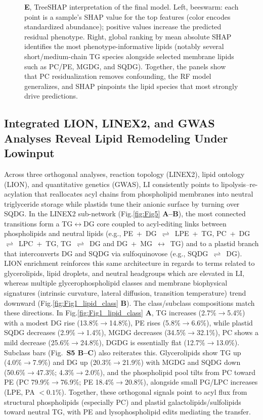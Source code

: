 \documentclass[10pt,letterpaper]{article}
\begin{document}
\begin{figure}[!ht]
{  \textbf{E}, TreeSHAP interpretation of the final model. Left, beeswarm: each point is a sample’s SHAP value for the top features (color encodes standardized abundance); positive values increase the predicted residual phenotype. Right, global ranking by mean absolute SHAP identifies the most phenotype-informative lipids (notably several short/medium-chain TG species alongside selected membrane lipids such as PC/PE, MGDG, and SQDG). 
  Together, the panels show that PC residualization removes confounding, the RF model generalizes, and SHAP pinpoints the lipid species that most strongly drive predictions.}
  \label{fig:fig4_rf_shap}
\end{figure}





\subsection*{Integrated LION, LINEX2, and GWAS Analyses Reveal Lipid Remodeling Under Lowinput}
Across three orthogonal analyses, reaction topology (LINEX2), lipid ontology (LION), and quantitative genetics (GWAS), LI consistently points to lipolysis–re-acylation that reallocates acyl chains from phospholipid membranes into neutral triglyceride storage while plastids tune their anionic surface by turning over SQDG. In the LINEX2 sub-network (Fig.\ref{fig:Fig5} \textbf{A–B}), the most connected transitions form a TG$\leftrightarrow$DG core coupled to acyl-editing links between phospholipids and neutral lipids (e.g., \mbox{PE + DG $\rightleftharpoons$ LPE + TG}, \mbox{PC + DG $\rightleftharpoons$ LPC + TG}, \mbox{TG $\rightleftharpoons$ DG} and \mbox{DG + MG $\leftrightarrow$ TG}) and to a plastid branch that interconverts DG and SQDG via sulfoquinovose (e.g., \mbox{SQDG  $\rightleftharpoons$ DG}). LION enrichment reinforces this same architecture in regards to terms related to glycerolipids, lipid droplets, and neutral headgroups which are elevated in LI, whereas multiple glycerophospholipid classes and membrane biophysical signatures (intrinsic curvature, lateral diffusion, transition temperature) trend downward (Fig.\ref{fig:Fig1_lipid_class} \textbf{B}). The class/subclass compositions match these directions. In Fig.\ref{fig:Fig1_lipid_class} \textbf{A}, TG increases (2.7\%$\rightarrow$5.4\%) with a modest DG rise (13.8\%$\rightarrow$14.8\%), PE rises (5.8\%$\rightarrow$6.6\%), while plastid SQDG decreases (2.9\%$\rightarrow$1.4\%), MGDG decreases (34.5\%$\rightarrow$32.1\%), PC shows a mild decrease (25.6\%$\rightarrow$24.8\%), DGDG is essentially flat (12.7\%$\rightarrow$13.0\%). Subclass bars (Fig.\ \textbf{S5 B–C}) also reiterates this. Glycerolipids show TG up (4.0\%$\rightarrow$7.9\%) and DG up (20.3\%$\rightarrow$21.9\%) with MGDG and SQDG down (50.6\%$\rightarrow$47.3\%; 4.3\%$\rightarrow$2.0\%), and the phospholipid pool tilts from PC toward PE (PC 79.9\%$\rightarrow$76.9\%; PE 18.4\%$\rightarrow$20.8\%), alongside small PG/LPC increases (LPE, PA $<0.1\%$). Together, these orthogonal signals point to acyl flux from structural phospholipids (especially PC) and plastid galactolipids/sulfolipids toward neutral TG, with PE and lysophospholipid edits mediating the transfer.
\end{document}
